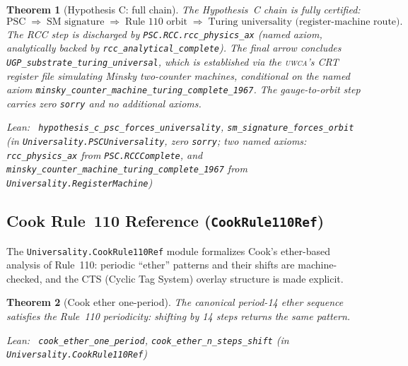 \documentclass[11pt,a4paper]{article}
\newenvironment{leanref}%
  {\par\smallskip\noindent\begingroup\raggedright\textup{Lean:}~}%
  {\par\endgroup}
\newtheorem{theorem}{Theorem}[section]
\theoremstyle{definition}
\newcommand{\uwca}{\textsc{uwca}}
\begin{document}
\begin{theorem}[Hypothesis C: full chain]\label{thm:hypothesis-c}
The Hypothesis~C chain is fully certified:
\[
  \text{PSC} \;\Rightarrow\; \text{SM signature}
  \;\Rightarrow\; \text{Rule 110 orbit}
  \;\Rightarrow\; \text{Turing universality (register-machine route).}
\]
The RCC step is discharged by \texttt{PSC.RCC.rcc\_physics\_ax}
(named axiom, analytically backed by \texttt{rcc\_analytical\_complete}).
The final arrow concludes \lstinline|UGP_substrate_turing_universal|, which is
established via the \uwca{}'s CRT register file simulating Minsky two-counter
machines, conditional on the named axiom
\lstinline|minsky_counter_machine_turing_complete_1967|.
The gauge-to-orbit step carries zero \texttt{sorry} and no additional axioms.

\begin{leanref}
\lstinline|hypothesis_c_psc_forces_universality|,
\lstinline|sm_signature_forces_orbit|
\textup{(in \texttt{Universality.PSCUniversality}, zero \texttt{sorry};
two named axioms: \texttt{rcc\_physics\_ax} from \texttt{PSC.RCCComplete}, and
\texttt{minsky\_counter\_machine\_turing\_complete\_1967} from
\texttt{Universality.RegisterMachine})}
\end{leanref}
\end{theorem}

\subsection[Cook Rule~110 Reference]{Cook Rule~110 Reference (\texttt{CookRule110Ref})}\label{subsec:cook-rule110-ref}

The \texttt{Universality.CookRule110Ref} module formalizes Cook's ether-based
analysis of Rule~110: periodic ``ether'' patterns and their shifts are machine-checked,
and the CTS (Cyclic Tag System) overlay structure is made explicit.

\begin{theorem}[Cook ether one-period]\label{thm:cook-ether}
The canonical period-14 ether sequence satisfies the Rule~110 periodicity:
shifting by 14 steps returns the same pattern.

\begin{leanref}
\lstinline|cook_ether_one_period|, \lstinline|cook_ether_n_steps_shift|
\textup{(in \texttt{Universality.CookRule110Ref})}
\end{leanref}
\end{theorem}
\end{document}
